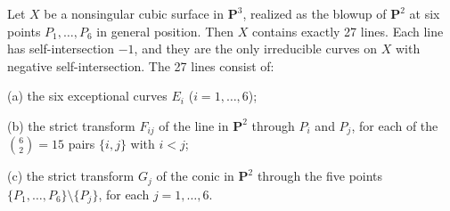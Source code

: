 Let $X$ be a nonsingular cubic surface in $\mathbf{P}^3$, realized as the blowup of $\mathbf{P}^2$ at six points $P_1, \ldots, P_6$ in general position. Then $X$ contains exactly 27 lines. Each line has self-intersection $-1$, and they are the only irreducible curves on $X$ with negative self-intersection. The 27 lines consist of:

(a) the six exceptional curves $E_i$ ($i = 1, \ldots, 6$);

(b) the strict transform $F_{ij}$ of the line in $\mathbf{P}^2$ through $P_i$ and $P_j$, for each of the $\binom{6}{2} = 15$ pairs $\{i,j\}$ with $i < j$;

(c) the strict transform $G_j$ of the conic in $\mathbf{P}^2$ through the five points $\{P_1, \ldots, P_6\} \setminus \{P_j\}$, for each $j = 1, \ldots, 6$.

